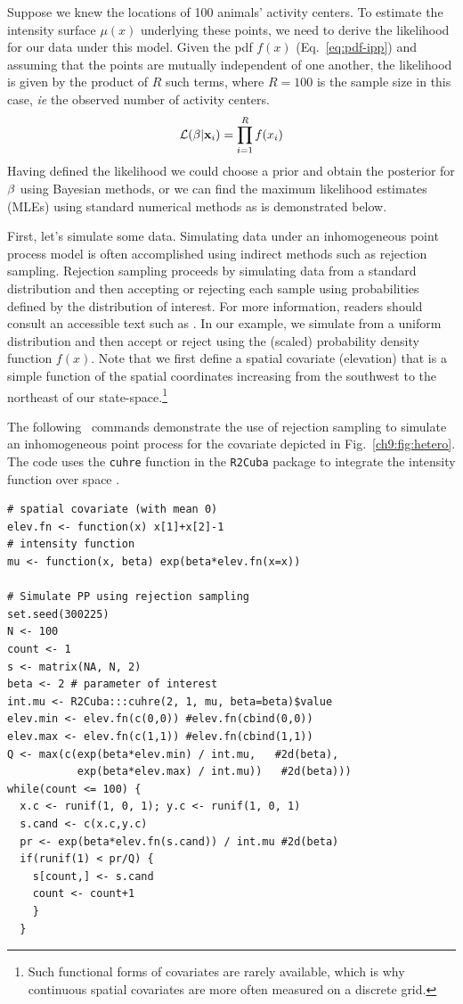 Suppose we knew the locations of 100 animals' activity
centers. To estimate the intensity surface $\mu(x)$ underlying these points, we
need to derive the likelihood for our data under this model. Given the
pdf $f(x)$ (Eq.~\ref{eq:pdf-ipp}) and assuming that the points are
mutually independent of one another,
the likelihood is given by the product
of $R$ such terms, where $R=100$ is the sample size in this case,
\emph{ie} the observed number of activity centers.
\[
\mathcal{L}({\bf \beta} | {\bf x}_i) = \prod_{i=1}^R f(x_i)
\]
Having defined the likelihood we could choose a prior and obtain the posterior for
$\bf \beta$ using Bayesian methods, or we can find the maximum likelihood
estimates (MLEs) using standard numerical methods as is demonstrated
below.

First, let's simulate some data. Simulating data under an inhomogeneous point process model is often
accomplished using indirect methods such as rejection
sampling. Rejection sampling proceeds by
simulating data from a standard distribution and then accepting or
rejecting each sample using probabilities defined by the distribution
of interest. For more information, readers should consult an
accessible text such as \citet{robert_casella:2004}. In our example, we
simulate from a uniform distribution and then accept or reject using
the (scaled) probability density function $f(x)$. Note that we first define a
spatial covariate (elevation) that is a simple function of the spatial
coordinates increasing from the southwest to the northeast of our
state-space.\footnote{Such functional forms of
covariates are rarely available, which is why continuous spatial
covariates are more often measured on a discrete grid.}

The following \R~commands demonstrate the use of rejection sampling to
simulate an inhomogeneous point process for the covariate depicted in
Fig.~\ref{ch9:fig:hetero}. The code uses the \verb+cuhre+ function in
the {\tt R2Cuba} package to integrate the intensity function over
space \citep{hahn_etal:2011}.

\begin{small}
\begin{verbatim}
# spatial covariate (with mean 0)
elev.fn <- function(x) x[1]+x[2]-1
# intensity function
mu <- function(x, beta) exp(beta*elev.fn(x=x))

# Simulate PP using rejection sampling
set.seed(300225)
N <- 100
count <- 1
s <- matrix(NA, N, 2)
beta <- 2 # parameter of interest
int.mu <- R2Cuba:::cuhre(2, 1, mu, beta=beta)$value
elev.min <- elev.fn(c(0,0)) #elev.fn(cbind(0,0))
elev.max <- elev.fn(c(1,1)) #elev.fn(cbind(1,1))
Q <- max(c(exp(beta*elev.min) / int.mu,   #2d(beta),
           exp(beta*elev.max) / int.mu))   #2d(beta)))
while(count <= 100) {
  x.c <- runif(1, 0, 1); y.c <- runif(1, 0, 1)
  s.cand <- c(x.c,y.c)
  pr <- exp(beta*elev.fn(s.cand)) / int.mu #2d(beta)
  if(runif(1) < pr/Q) {
    s[count,] <- s.cand
    count <- count+1
    }
  }
\end{verbatim}
\end{small}


